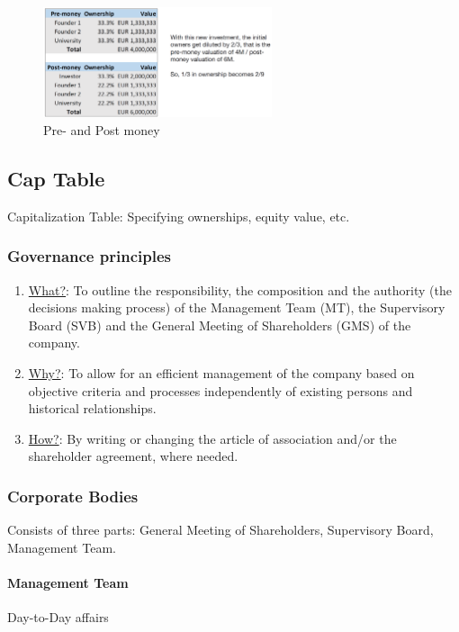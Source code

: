 \begin{figure}[H]
    \centering
    \includegraphics[width=0.6\textwidth]{Pictures/pre_and_post_money.png}
    \caption{Pre- and Post money}
\end{figure}

\subsection{Cap Table}

Capitalization Table: Specifying ownerships, equity value, etc.

\subsubsection{Governance principles}

\begin{enumerate}[]
    \item \underline{What?}: To outline the responsibility, the composition and the
        authority (the decisions making process) of the Management Team (MT), the
        Supervisory Board (SVB) and the General Meeting of Shareholders (GMS) of
        the company.
    \item \underline{Why?}: To allow for an efficient management of the company
        based on objective criteria and processes independently of existing persons
        and historical relationships.
    \item \underline{How?}: By writing or changing the article of association and/or
        the shareholder agreement, where needed.
\end{enumerate}

\subsubsection{Corporate Bodies}

Consists of three parts: General Meeting of Shareholders, Supervisory Board,
Management Team.

\paragraph{Management Team} Day-to-Day affairs

